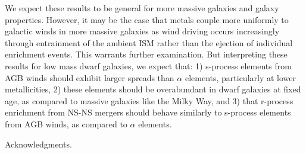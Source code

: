 \documentclass[twocolumn]{aastex61}
\begin{document}
We expect these results to be general for more massive galaxies and galaxy properties. However, it may be the case that metals couple more uniformly to galactic winds in more massive galaxies as wind driving occurs increasingly through entrainment of the ambient ISM rather than the ejection of individual enrichment events. This warrants further examination. But interpreting these results for low mass dwarf galaxies, we expect that: 1) s-process elements from AGB winds should exhibit larger spreads than $\alpha$ elements, particularly at lower metallicities, 2) these elements should be overabundant in dwarf galaxies at fixed age, as compared to massive galaxies like the Milky Way, and 3) that r-process enrichment from NS-NS mergers should behave similarly to s-process elements from AGB winds, as compared to $\alpha$ elements.




\acknowledgments
Acknowledgments.









\appendix
\renewcommand\thefigure{\thesection.\arabic{figure}}
\setcounter{figure}{0}
\end{document}
